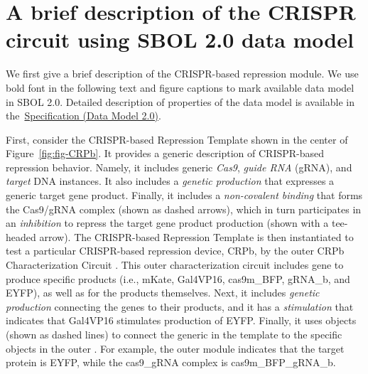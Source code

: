 \section*{A brief description of the CRISPR circuit using SBOL 2.0 data model}
We first give a brief description of the CRISPR-based repression module. We use bold font in the following text and figure captions to mark available data model in SBOL 2.0. Detailed description of properties of the data model is available in the~\href{http://sbolstandard.org/downloads/specification-data-model-2-0/}{Specification
  (Data Model 2.0)}.

First, consider the CRISPR-based Repression Template  shown in the center of Figure~\ref{fig:fig-CRPb}. It provides a generic description of CRISPR-based repression behavior. Namely, it includes generic \emph{Cas9}, \emph{guide RNA} (gRNA), and \emph{target} DNA  instances. It also includes a \emph{genetic production}  that expresses a generic target gene product.  Finally, it includes a \emph{non-covalent binding}  that forms the Cas9/gRNA complex (shown as dashed arrows), which in turn participates in an \emph{inhibition}  to repress the target gene product production (shown with a tee-headed arrow). The CRISPR-based Repression Template is then instantiated to test a particular CRISPR-based repression device, CRPb, by the outer CRPb Characterization Circuit .  This outer characterization circuit includes gene  to produce specific products (i.e., mKate, Gal4VP16, cas9m\_BFP, gRNA\_b, and EYFP), as well as  for the products themselves.  Next, it includes \emph{genetic production}  connecting the genes to their products, and it has a \emph{stimulation}  that indicates that Gal4VP16 stimulates production of EYFP.  Finally, it uses  objects (shown as dashed lines) to connect the generic  in the template to the specific objects in the outer .  For example, the outer module indicates that the target protein is EYFP, while the cas9\_gRNA complex is cas9m\_BFP\_gRNA\_b.


